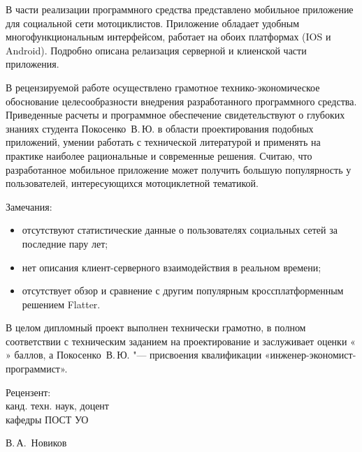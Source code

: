 \begin{singlespace}
{В части реализации программного средства представлено мобильное приложение для социальной сети мотоциклистов. Приложение обладает удобным многофункциональным интерфейсом, работает на обоих платформах (IOS и Android). Подробно описана релаизация серверной и клиенской части приложения.

В рецензируемой работе осуществлено грамотное технико-экономическое обоснование целесообразности внедрения разработанного программного средства.
Приведенные расчеты и программное обеспечение свидетельствуют о глубоких знаниях студента Покосенко~В.\,Ю. в области проектирования подобных приложений, умении работать с технической литературой и применять на практике наиболее рациональные и современные решения.
Считаю, что разработанное мобильное приложение может получить большую популярность у пользователей, интересующихся мотоциклетной тематикой.

Замечания:
\begin{itemize}
  \item отсутствуют статистические данные о пользователях социальных сетей за последние пару лет;
  \item нет описания клиент-серверного взаимодействия в реальном времени;
  \item отсутствует обзор и сравнение с другим популярным кроссплатформенным решением Flatter.
\end{itemize}

В целом дипломный проект выполнен технически грамотно, в полном соответствии с техническим заданием на проектирование и заслуживает оценки «\underline{ {} {} {} {} }» баллов, а Покосенко~В.\,Ю. "--- присвоения квалификации «инженер-экономист-программист».


  \vfill
  \noindent
  \vspace*{1cm}
  \begin{minipage}{0.29\textwidth}
    \begin{flushleft}
      Рецензент:\\
      канд. техн. наук, доцент\\
      кафедры ПОСТ УО
    \end{flushleft}
  \end{minipage}
  \begin{minipage}{0.58 \textwidth}
    \begin{flushleft}
    \hspace*{0.5cm}\underline{\hspace*{4cm}} В.\,А.~Новиков \\
   
    \end{flushleft}
  \end{minipage}
}

\end{singlespace}
\clearpage